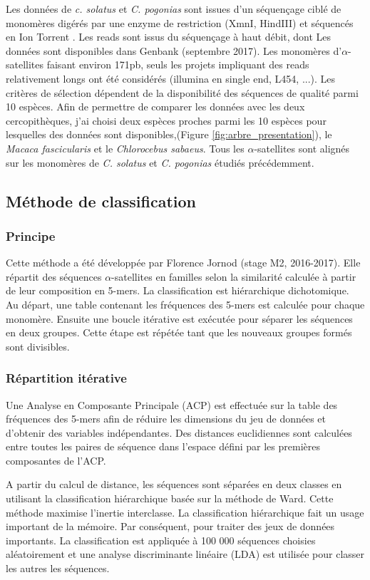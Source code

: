 \documentclass[12pt,a4paper]{article}
\begin{document}
Les données de \textit{c. solatus} et \textit{C. pogonias} sont issues d'un séquençage ciblé de monomères digérés par une enzyme de restriction (XmnI, HindIII) et séquencés en Ion Torrent \cite{Benjak2015}. Les reads sont issus du séquençage à haut débit, dont Les données sont disponibles dans Genbank (septembre 2017). Les monomères d'$\alpha$-satellites faisant environ 171pb,  seuls les projets impliquant des reads relativement longs ont été considérés (illumina en single end, L454, ...).
Les critères de sélection dépendent de la disponibilité des séquences de qualité parmi 10 espèces. Afin de permettre de comparer les données avec les deux cercopithèques, j'ai choisi deux espèces proches parmi les 10 espèces pour lesquelles des données sont disponibles,(Figure \ref{fig:arbre_presentation}), le \textit{Macaca fascicularis} et le \textit{Chlorocebus sabaeus}. Tous les $\alpha$-satellites sont alignés sur les monomères de \textit{C. solatus} et \textit{C. pogonias} étudiés précédemment.

\subsection{Méthode de classification}
	\subsubsection{Principe}
Cette méthode a été développée par Florence Jornod (stage M2, 2016-2017). Elle répartit des séquences $\alpha$-satellites en familles selon la similarité calculée à partir de leur composition en 5-mers. La classification est hiérarchique dichotomique. Au départ, une table contenant les fréquences des 5-mers est calculée pour chaque monomère. Ensuite une boucle itérative est exécutée pour séparer les séquences en deux groupes. Cette étape est répétée tant que les nouveaux groupes formés sont divisibles.

	\subsubsection{Répartition itérative}
Une Analyse en Composante Principale (ACP) est effectuée sur la table des fréquences des 5-mers afin de réduire les dimensions du jeu de données et d’obtenir des variables indépendantes. Des distances euclidiennes sont calculées entre toutes les paires de séquence dans l’espace défini par les premières composantes de l’ACP. 

A partir du calcul de distance, les séquences sont séparées en deux classes en utilisant la classification hiérarchique basée sur la méthode de Ward. Cette méthode maximise l’inertie interclasse. La classification hiérarchique fait un usage important de la mémoire. Par conséquent, pour traiter des jeux de données importants. La classification est appliquée à 100 000 séquences choisies aléatoirement et une analyse discriminante linéaire (LDA) est utilisée pour classer les autres les séquences.
\end{document}
